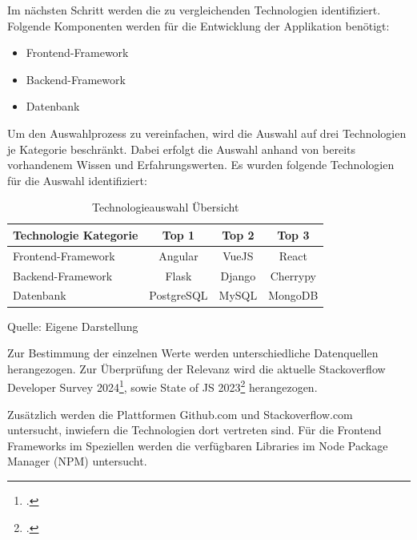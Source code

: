 Im nächsten Schritt werden die zu vergleichenden Technologien identifiziert.
Folgende Komponenten werden für die Entwicklung der Applikation benötigt:

\begin{itemize}
  \item Frontend-Framework
  \item Backend-Framework
  \item Datenbank
\end{itemize}

Um den Auswahlprozess zu vereinfachen, wird die Auswahl auf drei Technologien je Kategorie beschränkt.
Dabei erfolgt die Auswahl anhand von bereits vorhandenem Wissen und Erfahrungswerten.
Es wurden folgende Technologien für die Auswahl identifiziert:

\begin{table}[htbp]
  \centering
  \begin{tabular}{|l|c|c|c|}
      \hline
      \textbf{Technologie Kategorie} & \textbf{Top 1} & \textbf{Top 2} & \textbf{Top 3} \\ \hline
      {Frontend-Framework} & Angular & VueJS & React \\ \hline
      {Backend-Framework} & Flask & Django & Cherrypy \\ \hline
      {Datenbank} & PostgreSQL & MySQL & MongoDB \\ \hline
  \end{tabular}
  \caption{Technologieauswahl Übersicht}\label{tab:Technologieauswahl Übersicht}
  \raggedright Quelle: Eigene Darstellung
\end{table}

Zur Bestimmung der einzelnen Werte werden unterschiedliche Datenquellen herangezogen.
Zur Überprüfung der Relevanz wird die aktuelle Stackoverflow Developer Survey 2024\footcite{StackOverflow2024}, sowie State of JS 2023\footcite{stateofjsStateJavaScript2023} herangezogen.

Zusätzlich werden die Plattformen Github.com und Stackoverflow.com untersucht, inwiefern die Technologien dort vertreten sind.
Für die Frontend Frameworks im Speziellen werden die verfügbaren Libraries im Node Package Manager (NPM) untersucht.

